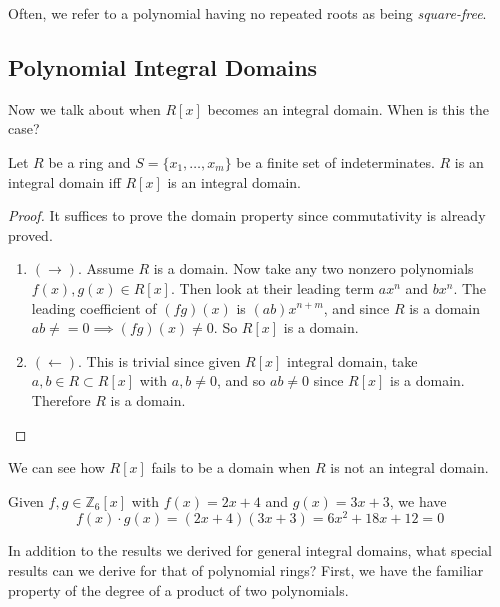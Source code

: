   Often, we refer to a polynomial having no repeated roots as being \textit{square-free}. 

\subsection{Polynomial Integral Domains}

  Now we talk about when $R[x]$ becomes an integral domain. When is this the case? 

  \begin{theorem}
    Let $R$ be a ring and $S = \{x_1, \ldots, x_m\}$ be a finite set of indeterminates. $R$ is an integral domain iff $R[x]$ is an integral domain. 
  \end{theorem}
  \begin{proof}
    It suffices to prove the domain property since commutativity is already proved. 
    \begin{enumerate}
      \item $(\rightarrow)$. Assume $R$ is a domain. Now take any two nonzero polynomials $f(x), g(x) \in R[x]$. Then look at their leading term $ax^n$ and $bx^n$. The leading coefficient of $(fg)(x)$ is $(ab) x^{n+m}$, and since $R$ is a domain $ab \neq = 0 \implies (fg)(x) \neq 0$. So $R[x]$ is a domain. 
      \item $(\leftarrow)$. This is trivial since given $R[x]$ integral domain, take $a, b \in R \subset R[x]$ with $a, b \neq 0$, and so $ab \neq 0$ since $R[x]$ is a domain. Therefore $R$ is a domain. 
    \end{enumerate}
  \end{proof}

  We can see how $R[x]$ fails to be a domain when $R$ is not an integral domain. 

  \begin{example}
    Given $f, g \in \mathbb{Z}_6 [x]$ with $f(x) = 2x + 4$ and $g(x) = 3x + 3$, we have 
    \begin{equation}
      f(x) \cdot g(x) = (2x + 4)(3x + 3) = 6x^2 + 18 x + 12 = 0
    \end{equation}
  \end{example}

  In addition to the results we derived for general integral domains, what special results can we derive for that of polynomial rings? First, we have the familiar property of the degree of a product of two polynomials. 

